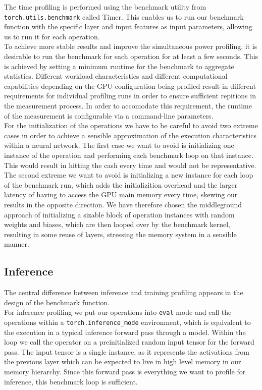 The time profiling is performed using the benchmark utility from \texttt{torch.utils.benchmark} called Timer. This enables us to run our benchmark function with the specific layer and input features as input parameters, allowing us to run it for each operation. \\
To achieve more stable results and improve the simultaneous power profiling, it is desirable to run the benchmark for each operation for at least a few seconds. This is achieved by setting a minimum runtime for the benchmark to aggregate statistics. Different workload characteristics and different computational capabilities depending on the GPU configuration being profiled result in different requirements for individual profiling runs in order to ensure sufficient repitions in the measurement process. In order to accomodate this requirement, the runtime of the measurement is configurable via a command-line parameters. \\
For the initialization of the operations we have to be careful to avoid two extreme cases in order to achieve a sensible approximation of the execution characteristics within a neural network. The first case we want to avoid is initializing one instance of the operation and performing each benchmark loop on that instance. This would result in hitting the cash every time and would not be representative. The second extreme we want to avoid is initializing a new instance for each loop of the benchmark run, which adds the initializition overhead and the larger latency of having to access the GPU main memory every time, skewing our results in the opposite direction. We have therefore chosen the middleground approach of initializing a sizable block of operation instances with random weights and biases, which are then looped over by the benchmark kernel, resulting in some reuse of layers, stressing the memory system in a sensible manner. \\


\subsection{Inference}
The central difference between inference and training profiling appears in the design of the benchmark function. \\
For inference profiling we put our operations into \texttt{eval} mode and call the operations within a \texttt{torch.inference\_mode} environment, which is equivalent to the execution in a typical inference forward pass through a model. Within the loop we call the operator on a preinitialized random input tensor for the forward pass. The input tensor is a single instance, as it represents the activations from the previous layer which can be expected to live in high level memory in our memory hierarchy. Since this forward pass is everything we want to profile for inference, this benchmark loop is sufficient.

